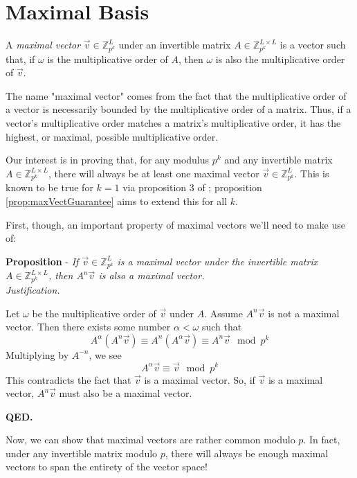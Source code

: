 \documentclass[a4paper, 12pt, reqno]{amsart}
\newcounter{propcounter}
\newenvironment{proposition}[1]
{
	\refstepcounter{propcounter}
	\textbf{Proposition \thepropcounter} - \emph{#1} \\
	\emph{Justification.}
}
{
	\textbf{QED.} \\
}
\begin{document}
	\section{Maximal Basis}
		\label{sec:maxBasis}
		A \emph{maximal vector} $\vec{v} \in \mathds{Z}_{p^k}^L$ under an invertible matrix $A \in \mathds{Z}_{p^k}^{L \times L}$ is a vector such that, if $\omega$ is the 
		multiplicative order of $A$, then $\omega$ is also the multiplicative order of $\vec{v}$.

		The name "maximal vector" comes from the fact that the multiplicative order of a vector is necessarily bounded by the multiplicative order of a matrix. Thus, if a 
		vector's multiplicative order matches a matrix's multiplicative order, it has the highest, or maximal, possible multiplicative order.
		
		Our interest is in proving that, for any modulus $p^k$ and any invertible matrix $A \in \mathds{Z}_{p^k}^{L \times L}$, there will always be at least one maximal 
		vector $\vec{v} \in \mathds{Z}_{p^k}^L$. This is known to be true for $k=1$ via proposition 3 of \citet{Mendivil2012}; proposition \ref{prop:maxVectGuarantee} aims
		to extend this for all $k$.
		
		First, though, an important property of maximal vectors we'll need to make use of:
		
		\begin{proposition}{If $\vec{v} \in \mathds{Z}_{p^k}^L$ is a maximal vector under the invertible matrix $A \in \mathds{Z}_{p^k}^{L \times L}$, then $A^n\vec{v}$ is
		also a maximal vector.}
			\label{prop:Amax}
			Let $\omega$ be the multiplicative order of $\vec{v}$ under $A$. Assume $A^n\vec{v}$ is not a maximal vector. Then there exists some number $\alpha < \omega$ 
			such that
			\[
				A^\alpha(A^n\vec{v}) \equiv A^n(A^\alpha\vec{v}) \equiv A^n\vec{v} \mod{p^k}
			\]
			Multiplying by $A^{-n}$, we see
			\[
				A^\alpha\vec{v} \equiv \vec{v} \mod{p^k}
			\]
			This contradicts the fact that $\vec{v}$ is a maximal vector. So, if $\vec{v}$ is a maximal vector, $A^n\vec{v}$ must also be a maximal vector.
		\end{proposition}
		
		Now, we can show that maximal vectors are rather common modulo $p$. In fact, under any invertible matrix modulo $p$, there will always be enough maximal vectors to 
		span the entirety of the vector space!
		
\end{document}
